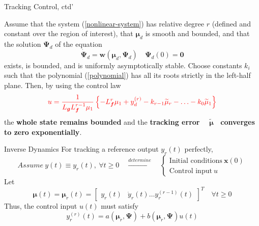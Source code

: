 \documentclass{beamer}
\renewcommand{\vec}[1]{\ensuremath{\boldsymbol{#1}}} %
\begin{document}
\begin{frame}{Tracking Control, ctd'}
    \begin{theorem}[6.4]
      Assume that the system (\ref{nonlinear-system}) has relative degree $r$ (defined and constant over the region of interest), that $\vec{\mu}_{d}$ is smooth and bounded, and that the solution $\vec{\Psi}_{d}$ of the equation
      $$
        \dot{\vec{\Psi}}_{d}=\vec{w}\left(\vec{\mu}_{d}, \vec{\Psi}_{d}\right) \quad \vec{\Psi}_{d}(0)=\vec{0}
      $$
      exists, is bounded, and is uniformly asymptotically stable. Choose constants $k_{i}$ such that the polynomial (\ref{polynomial}) has all its roots strictly in the left-half plane. Then, by using the control law
      \begin{equation}
        {\color{red} u=\frac{1}{L_{\vec{g}} L_{\vec{f}}^{r-1} \mu_{1}}\left\{-L_{\vec{f}}^{r} \mu_{1}+y_{d}^{(r)}-k_{r-1} \widetilde{\mu}_{r}-\ldots-k_{0} \widetilde{\mu}_{1}\right\} }
      \end{equation}
      the \textbf{whole state remains bounded} and the \textbf{tracking error ~ $\widetilde{\vec{\mu}}$~ converges to zero exponentially}.
    \end{theorem}
\end{frame}

\begin{frame}{Inverse Dynamics}
    For {\color{red}tracking a reference output $y_{r}(t)$ perfectly},
    \begin{equation}\label{thought-inverse}\nonumber
     Assume ~y(t)\equiv y_{r}(t), ~\forall t \geq 0 \quad \xrightarrow{determine}\quad \left\{
      \begin{matrix}
        \text{Initial conditions}~\vec{x}(0) \\
        \text{Control input}~u
      \end{matrix}\right.
    \end{equation}
    Let
    $$
    \vec{\mu}(t)=\vec{\mu}_{r}(t)=\left[\begin{array}{ll}{y_{r}(t)} & {\dot{y}_{r}(t) \ldots y_{r}^{(r-1)}(t)}\end{array}\right]^{T} \quad \forall t \geq 0
    $$
    Thus, the control input $u(t)$ must satisfy
    $$
    y_{r}^{(r)}(t)=a\left(\vec{\mu}_{r}, \vec{\Psi}\right)+b\left(\vec{\mu}_{r}, \vec{\Psi} \right) u(t)
    $$
\end{frame}
\end{document}
